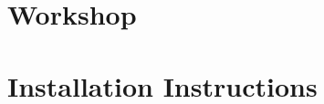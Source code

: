  \appendix

\chapter{Workshop} \label{chap:workshop}


\chapter{Installation Instructions}


%

%

%
